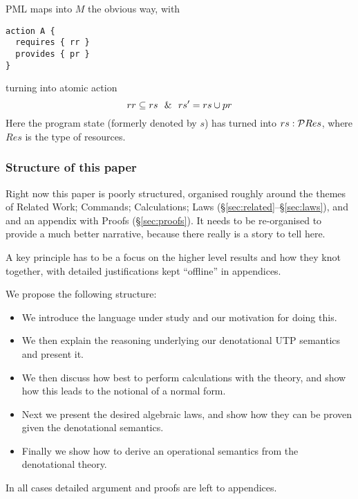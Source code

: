 PML maps into $M$ the obvious way,
with
\begin{verbatim}
action A {
  requires { rr }
  provides { pr }
}
\end{verbatim}
turning into atomic action
\[
rr \subseteq rs ~~\&~~ rs' = rs \cup pr
\]
Here the program state (formerly denoted by $s$)
has turned into $rs:\mathcal{P} Res$, where $Res$ is the type of resources.

\subsubsection{Structure of this paper}

Right now this paper is poorly structured,
organised roughly around the themes of
Related Work;
Commands;
Calculations;
Laws (\S\ref{sec:related}--\S\ref{sec:laws}),
and and an appendix with Proofs (\S\ref{sec:proofs}).
It needs to be re-organised to provide a much better narrative,
because there really is a story to tell here.

A key principle has to be a focus on the higher level results and how
they knot together,
with detailed justifications kept ``offline'' in appendices.

We propose the following structure:
\begin{itemize}
  \item
     We introduce the language under study and our motivation for doing this.
  \item
     We then explain the reasoning underlying our denotational
     UTP semantics and present it.
  \item
     We then discuss how best to perform calculations with the theory,
     and show how this leads to the notional of a normal form.
  \item
     Next we present the desired algebraic laws,
     and show how they can be proven given the denotational semantics.
  \item
     Finally we show how to derive an operational semantics from
     the denotational theory.
\end{itemize}
In all cases detailed argument and proofs are left to appendices.
